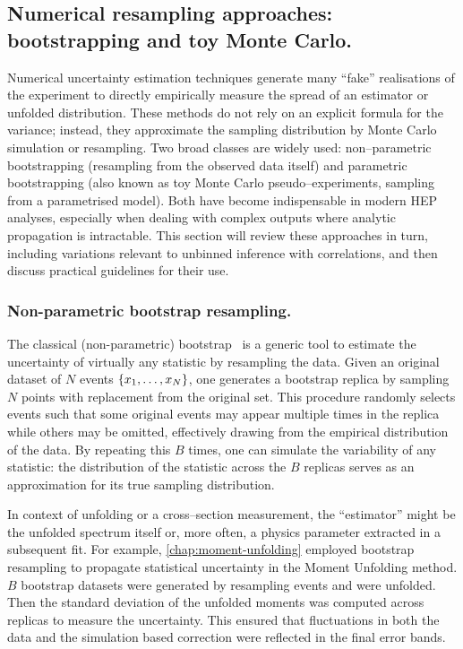     \subsection{Numerical resampling approaches: bootstrapping and toy Monte Carlo.}
        Numerical uncertainty estimation techniques generate many ``fake'' realisations of the experiment to directly empirically measure the spread of an estimator or unfolded distribution.
        These methods do not rely on an explicit formula for the variance; instead, they approximate the sampling distribution by Monte Carlo simulation or resampling. 
        Two broad classes are widely used: non--parametric bootstrapping (resampling from the observed data itself) and parametric bootstrapping (also known as toy Monte Carlo pseudo--experiments, sampling from a parametrised model).
        Both have become indispensable in modern HEP analyses, especially when dealing with complex outputs where analytic propagation is intractable.
        This section will review these approaches in turn, including variations relevant to unbinned inference with correlations, and then discuss practical guidelines for their use.
        \subsubsection{Non-parametric bootstrap resampling.}
            The classical (non-parametric) bootstrap~\cite{zivot_86_2025} is a generic tool to estimate the uncertainty of virtually any statistic by resampling the data.
            Given an original dataset of $N$ events $\qty{x_1,\dots,x_N}$, one generates a bootstrap replica by sampling $N$ points with replacement from the original set.
            This procedure randomly selects events such that some original events may appear multiple times in the replica while others may be omitted, effectively drawing from the empirical distribution of the data.
            By repeating this $B$ times, one can simulate the variability of any statistic: the distribution of the statistic across the $B$ replicas serves as an approximation for its true sampling distribution.
            
            In context of unfolding or a cross--section measurement, the ``estimator'' might be the unfolded spectrum itself or, more often, a physics parameter extracted in a subsequent fit.
            For example, \cref{chap:moment-unfolding} employed bootstrap resampling to propagate statistical uncertainty in the Moment Unfolding method.
            $B$ bootstrap datasets were generated by resampling events and were unfolded.
            Then the standard deviation of the unfolded moments was computed across replicas to measure the uncertainty.
            This ensured that fluctuations in both the data and the simulation based correction were reflected in the final error bands.

